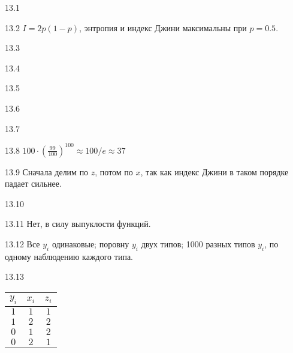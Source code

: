 \protect \hypertarget {soln:13.1}{}
\begin{solution}{{13.1}}
\end{solution}
\protect \hypertarget {soln:13.2}{}
\begin{solution}{{13.2}}
$I = 2p(1-p)$, энтропия и индекс Джини максимальны при $p=0.5$.
\end{solution}
\protect \hypertarget {soln:13.3}{}
\begin{solution}{{13.3}}
\end{solution}
\protect \hypertarget {soln:13.4}{}
\begin{solution}{{13.4}}
\end{solution}
\protect \hypertarget {soln:13.5}{}
\begin{solution}{{13.5}}
\end{solution}
\protect \hypertarget {soln:13.6}{}
\begin{solution}{{13.6}}

\end{solution}
\protect \hypertarget {soln:13.7}{}
\begin{solution}{{13.7}}
\end{solution}
\protect \hypertarget {soln:13.8}{}
\begin{solution}{{13.8}}
$100\cdot \left(\frac{99}{100} \right)^{100}\approx 100/e \approx 37$
\end{solution}
\protect \hypertarget {soln:13.9}{}
\begin{solution}{{13.9}}
Сначала делим по $z$, потом по $x$, так как индекс Джини в таком порядке падает сильнее.
\end{solution}
\protect \hypertarget {soln:13.10}{}
\begin{solution}{{13.10}}

\end{solution}
\protect \hypertarget {soln:13.11}{}
\begin{solution}{{13.11}}
Нет, в силу выпуклости функций.
\end{solution}
\protect \hypertarget {soln:13.12}{}
\begin{solution}{{13.12}}
Все $y_i$ одинаковые; поровну $y_i$ двух типов; 1000 разных типов $y_i$, по одному наблюдению каждого типа.
\end{solution}
\protect \hypertarget {soln:13.13}{}
\begin{solution}{{13.13}}
\begin{tabular}{ccc}
\toprule
$y_i$ & $x_i$ & $z_i$ \\
\midrule
$1$ & $1$ & $1$ \\
$1$ & $2$ & $2$ \\
$0$ & $1$ & $2$ \\
$0$ & $2$ & $1$\\
\bottomrule
\end{tabular}
\end{solution}
